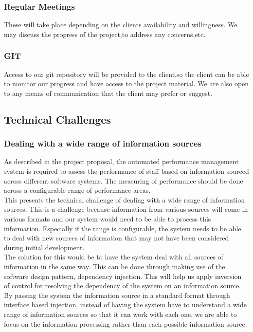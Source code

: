 \documentclass[a4paper,12pt]{article}
\begin{document}
\subsubsection{Regular Meetings}
These will take place depending on the clients availability and willingness.
We may discuss the progress of the project,to address any concerns,etc.
\subsubsection{GIT}
Access to our git repository will be provided to the client,so the client can be able to monitor
our progress and have access to the project material.
We are also open to any means of communication that the client may prefer or suggest.
\subsection{Technical Challenges}
\subsubsection{Dealing with a wide range of information sources}
As described in the project proposal, the automated performance management system is required to assess the performance of staff based on information sourced across different software systems. The measuring of performance should be done across a configurable range of performance areas.\\

This presents the technical challenge of dealing with a wide range of information sources. This is a challenge because information from various sources will come in various formats and our system would need to be able to process this information. Especially if the range is configurable, the system needs to be able to deal with new sources of information that may not have been considered during initial development.\\

The solution for this would be to have the system deal with all sources of information in the same way. This can be done through making use of the software design pattern, dependency injection. This will help us apply inversion of control for resolving the dependency of the system on an information source. By passing the system the information source in a standard format through interface based injection, instead of having the system have to understand a wide range of information sources so that it can work with each one, we are able to focus on the information processing rather than each possible information source.
\end{document}
